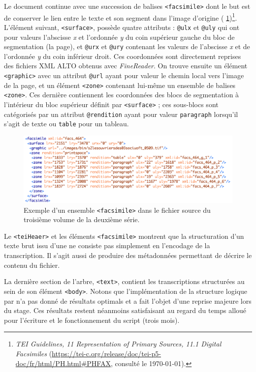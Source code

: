 Le document continue avec une succession de balises \texttt{<facsimile>} dont le but est de conserver le lien entre le texte et son segment dans l'image d'origine (\fig{} \ref{fig:facsimile})\footnote{\textit{TEI Guidelines, 11 Representation of Primary Sources, 11.1 Digital Facsimiles} (\url{https://tei-c.org/release/doc/tei-p5-doc/fr/html/PH.html\#PHFAX}, consulté le \today).}. L'élément suivant, \texttt{<surface>}, possède quatre attributs : \texttt{@ulx} et \texttt{@uly} qui ont pour valeurs l'abscisse \textit{x} et l'ordonnée \textit{y} du coin supérieur gauche du bloc de segmentation (la page), et \texttt{@urx} et \texttt{@ury} contenant les valeurs de l'abscisse \textit{x} et de l'ordonnée \textit{y} du coin inférieur droit. Ces coordonnées sont directement reprises des fichiers XML ALTO obtenus avec \textit{FineReader}. On trouve ensuite un élément \texttt{<graphic>} avec un attribut \texttt{@url} ayant pour valeur le chemin local vers l'image de la page, et un élément \texttt{<zone>} contenant lui-même un ensemble de balises \texttt{<zone>}. Ces dernière contiennent les coordonnées des blocs de segmentation à l'intérieur du bloc supérieur définit par \texttt{<surface>} ; ces sous-blocs sont catégorisés par un attribut \texttt{@rendition} ayant pour valeur \texttt{paragraph} lorsqu'il s'agit de texte ou \texttt{table} pour un tableau.

\begin{figure}
    \centering
    \includegraphics[width=16cm]{img/facsimile.png}
    \caption[Exemple d'un ensemble \texttt{<facsimile>}]{Exemple d'un ensemble \texttt{<facsimile>} dans le fichier source du troisième volume de la deuxième série.}
    \label{fig:facsimile}
\end{figure}

Le \texttt{<teiHeaer>} et les éléments \texttt{<facsimile>} montrent que la structuration d'un texte brut issu d'une \ocr{} ne consiste pas simplement en l'encodage de la transcription. Il s'agit aussi de produire des métadonnées permettant de décrire le contenu du fichier.

La dernière section de l'arbre, \texttt{<text>}, contient les transcriptions structurées au sein de son élément \texttt{<body>}. Notons que l'implémentation de la structure logique par \lse{} n'a pas donné de résultats optimals et a fait l'objet d'une reprise majeure lors du stage. Ces résultats restent néanmoins satisfaisant au regard du temps alloué pour l'écriture et le fonctionnement du  script (trois mois). 

